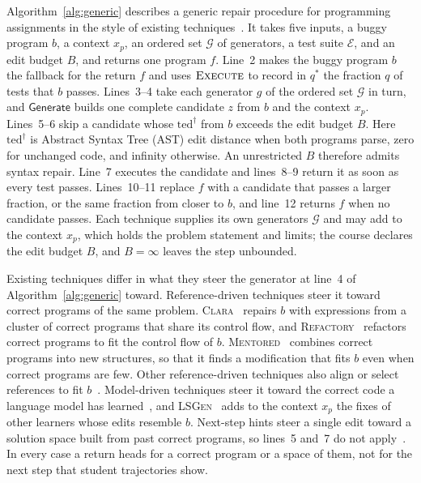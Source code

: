 \documentclass[10pt,conference]{IEEEtran}
\begin{document}
Algorithm~\ref{alg:generic} describes a generic repair procedure for programming assignments in the style of existing techniques~\cite{gulwani2018automated,wang2018search,hu2019re}. It takes five inputs, a buggy program \(b\), a context \(x_p\), an ordered set \(\mathcal G\) of generators, a test suite \(\mathcal E\), and an edit budget \(B\), and returns one program \(f\). Line~2 makes the buggy program \(b\) the fallback for the return \(f\) and uses \(\textsc{Execute}\) to record in \(q^*\) the fraction \(q\) of tests that \(b\) passes. Lines~3--4 take each generator \(g\) of the ordered set \(\mathcal G\) in turn, and \(\mathsf{Generate}\) builds one complete candidate \(z\) from \(b\) and the context \(x_p\). Lines~5--6 skip a candidate whose \(\mathrm{ted}^{\dagger}\) from \(b\) exceeds the edit budget \(B\). Here \(\mathrm{ted}^{\dagger}\) is Abstract Syntax Tree (AST) edit distance when both programs parse, zero for unchanged code, and infinity otherwise. An unrestricted \(B\) therefore admits syntax repair. Line~7 executes the candidate and lines~8--9 return it as soon as every test passes. Lines~10--11 replace \(f\) with a candidate that passes a larger fraction, or the same fraction from closer to \(b\), and line~12 returns \(f\) when no candidate passes. Each technique supplies its own generators \(\mathcal G\) and may add to the context \(x_p\), which holds the problem statement and limits; the course declares the edit budget \(B\), and \(B=\infty\) leaves the step unbounded.

Existing techniques differ in what they steer the generator at line~4 of Algorithm~\ref{alg:generic} toward. Reference-driven techniques steer it toward correct programs of the same problem. \textsc{Clara}~\cite{gulwani2018automated} repairs \(b\) with expressions from a cluster of correct programs that share its control flow, and \textsc{Refactory}~\cite{hu2019re} refactors correct programs to fit the control flow of \(b\). \textsc{Mentored}~\cite{choi2025automated} combines correct programs into new structures, so that it finds a modification that fits \(b\) even when correct programs are few. Other reference-driven techniques also align or select references to fit \(b\)~\cite{wang2018search,choi2021automated,xie2024brafar}. Model-driven techniques steer it toward the correct code a language model has learned~\cite{joshi2023repair,heo2023referent,zhang2024pydex,phung2023generating,liu2024fastfixer,yang2024cref,zhao2026peer,orvalho2025counterexample}, and \textsc{LSGen}~\cite{dai2026learner} adds to the context \(x_p\) the fixes of other learners whose edits resemble \(b\). Next-step hints steer a single edit toward a solution space built from past correct programs, so lines~5 and~7 do not apply~\cite{piech2015learning,rivers2017data,price2017isnap,roest2024next}. In every case a return heads for a correct program or a space of them, not for the next step that student trajectories show.
\end{document}
